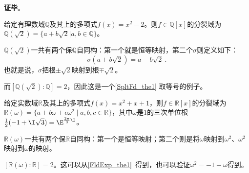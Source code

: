 










\textbf{证毕}。





\begin{example}{}

给定有理数域$\mathbb{Q}$及其上的多项式$f(x)=x^2-2$。则$f\in\mathbb{Q}[x]$的分裂域为$\mathbb{Q}(\sqrt{2})=\{a+b\sqrt{2}|a, b\in\mathbb{Q}\}$。

$\mathbb{Q}(\sqrt{2})$一共有两个保$\mathbb{Q}$自同构：第一个就是恒等映射，第二个$\sigma$则定义如下：
\begin{equation}
\sigma(a+b\sqrt{2})=a-b\sqrt{2}~.
\end{equation}
也就是说，$\sigma$把根$\pm\sqrt{2}$映射到根$\mp\sqrt{2}$。


而$[\mathbb{Q}(\sqrt{2}):\mathbb{Q}]=2$，因此这是一个\autoref{SpltFd_the1} 取等号的例子。

\end{example}


\begin{example}{}
给定实数域$\mathbb{R}$及其上的多项式$f(x)=x^2+x+1$，则$f\in\mathbb{R}[x]$的分裂域为$\mathbb{R}(\omega)=\{a+b\omega+c\omega^2 \mid a, b, c\in\mathbb{R}\}$，其中$\omega$是$1$的三次单位根$\frac{1}{2}(-1+\I\sqrt{3})=\E^{\frac{2\pi}{3}\I}$。

$\mathbb{R}(\omega)$一共有两个保$\mathbb{R}$自同构：第一个是恒等映射；第二个则是将$\omega$映射到$\omega^2$、$\omega^2$映射到$\omega$的映射。

$[\mathbb{R}(\omega):\mathbb{R}]=2$。这可以从\autoref{FldExp_the1}~得到，也可以验证$\omega^2=-1-\omega$得到。
\end{example}



